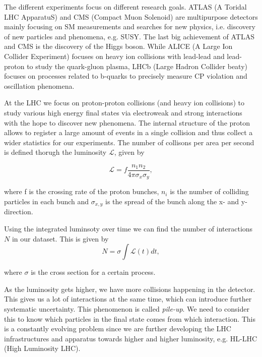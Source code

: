 The different experiments focus on different research goals. ATLAS (A Toridal LHC ApparatuS) and CMS (Compact
Muon Solenoid) are multipurpose detectors mainly focusing on SM measurements and searches for new physics, i.e. discovery of new particles and phenomena, e.g. SUSY. The last big achievement of ATLAS and CMS is the discovery of the Higgs boson. While ALICE (A Large Ion Collider Experiment) focuses on heavy ion collisions with lead-lead and lead-proton to study the quark-gluon plasma, LHCb (Large Hadron Collider beaty) focuses on processes related to b-quarks to precisely measure CP violation and oscillation phenomena. 

At the LHC we focus on proton-proton collisions (and heavy ion collisions) to study various high energy final states via electroweak and strong interactions with the hope to discover new phenomena. The internal structure of the proton allows to register a large amount of events in a single collision and thus collect a wider statistics for our experiments. The number of collisons per area per second is defined thorugh the luminosity $\mathscr{L}$, given by

\begin{equation}
    \label{eq:lumi}
    \mathscr{L} = f \frac{n_1 n_2}{4 \pi \sigma_x \sigma_y},
\end{equation}

where f is the crossing rate of the proton bunches, $n_i$ is the number of colliding particles in each bunch and $\sigma_{x,y}$ is the spread of the bunch along the x- and y-direction.  

Using the integrated luminsoty over time we can find the number of interactions $N$ in our dataset. This is given by  
\begin{equation}
    \label{eq:intLumi}
    N = \sigma \int \mathscr{L}(t) dt, 
\end{equation}

where $\sigma$ is the cross section for a certain process. 

As the luminosity gets higher, we have more collisions happening in the detector. This gives us a lot of interactions at the same time, which can introduce further systematic uncertainty. This phenomenon is called \textit{pile-up}. We need to consider this to know which particles in the final state comes from which interaction. This is a constantly evolving problem since we are further developing the LHC infrastructures and apparatus towards higher and higher luminosity, e.g. HL-LHC (High Luminosity LHC).






